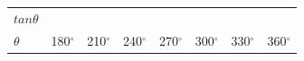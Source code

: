 \begin{center}
\begin{xtabular*}{\mytablewidth}[t]{|p{10\mystarwidth}|p{10\mystarwidth}|p{10\mystarwidth}|p{10\mystarwidth}|p{10\mystarwidth}|p{10\mystarwidth}|p{10\mystarwidth}|p{10\mystarwidth}|}
    $tan\theta $
    &
&
&
&
&
&
&
\tabularnewline{}
    $\theta $
    &
180${}^{\circ }$ &
210${}^{\circ }$ &
240${}^{\circ }$ &
270${}^{\circ }$ &
300${}^{\circ }$ &
330${}^{\circ }$ &
360${}^{\circ }$%

\end{xtabular*}
\end{center}
